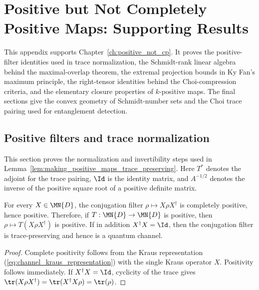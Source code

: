\chapter{Positive but Not Completely Positive Maps: Supporting Results}
\label{ch:positive_not_cp_supporting_results}

This appendix supports Chapter~\ref{ch:positive_not_cp}. It proves the
positive-filter identities used in trace normalization, the Schmidt-rank
linear algebra behind the maximal-overlap theorem, the extremal projection
bounds in Ky Fan's maximum principle, the right-tensor identities behind the
Choi-compression criteria, and the elementary closure properties of
$k$-positive maps. The final sections give the convex geometry of
Schmidt-number sets and the Choi trace pairing used for entanglement
detection.

\section{Positive filters and trace normalization}

This section proves the normalization and invertibility steps used in
Lemma~\ref{lem:making_positive_maps_trace_preserving}. Here $T^*$ denotes the
adjoint for the trace pairing, $\Id$ is the identity matrix, and $A^{-1/2}$
denotes the inverse of the positive square root of a positive definite matrix.

\begin{theorem}
    \label{thm:conjugation_filters_preserve_positivity}
    \leanok
    For every $X\in\MN{D}$, the conjugation filter
    $\rho\mapsto X\rho X^\dagger$ is completely positive, hence positive.
    Therefore, if $T:\MN{D}\to\MN{D}$ is positive, then
    $\rho\mapsto T(X\rho X^\dagger)$ is positive. If in addition
    $X^\dagger X=\Id$, then the conjugation filter is trace-preserving and
    hence is a quantum channel.
\end{theorem}

\begin{proof}\leanok
    Complete positivity follows from the Kraus representation
    (\ref{eq:channel_kraus_representation}) with the single Kraus operator
    $X$. Positivity follows immediately. If $X^\dagger X=\Id$, cyclicity of
    the trace gives
    $\tr(X\rho X^\dagger)=\tr(X^\dagger X\rho)=\tr(\rho)$.
\end{proof}

